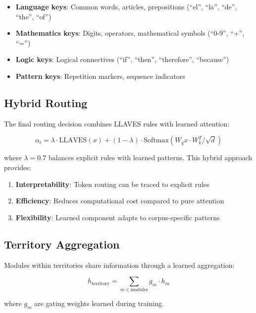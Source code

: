 \documentclass[11pt,a4paper]{article}
\begin{document}
\begin{itemize}
    \item \textbf{Language keys}: Common words, articles, prepositions (``el'', ``la'', ``de'', ``the'', ``of'')
    \item \textbf{Mathematics keys}: Digits, operators, mathematical symbols (``0-9'', ``+'', ``='')
    \item \textbf{Logic keys}: Logical connectives (``if'', ``then'', ``therefore'', ``because'')
    \item \textbf{Pattern keys}: Repetition markers, sequence indicators
\end{itemize}

\subsection{Hybrid Routing}

The final routing decision combines LLAVES rules with learned attention:

\begin{equation}
    \alpha_t = \lambda \cdot \text{LLAVES}(x) + (1-\lambda) \cdot \text{Softmax}(W_q x \cdot W_k^T / \sqrt{d})
    \label{eq:hybrid_routing}
\end{equation}

where $\lambda = 0.7$ balances explicit rules with learned patterns. This hybrid approach provides:

\begin{enumerate}
    \item \textbf{Interpretability}: Token routing can be traced to explicit rules
    \item \textbf{Efficiency}: Reduces computational cost compared to pure attention
    \item \textbf{Flexibility}: Learned component adapts to corpus-specific patterns
\end{enumerate}

\subsection{Territory Aggregation}

Modules within territories share information through a learned aggregation:

\begin{equation}
    h_{\text{territory}} = \sum_{m \in \text{modules}} g_m \cdot h_m
\end{equation}

where $g_m$ are gating weights learned during training.
\end{document}
